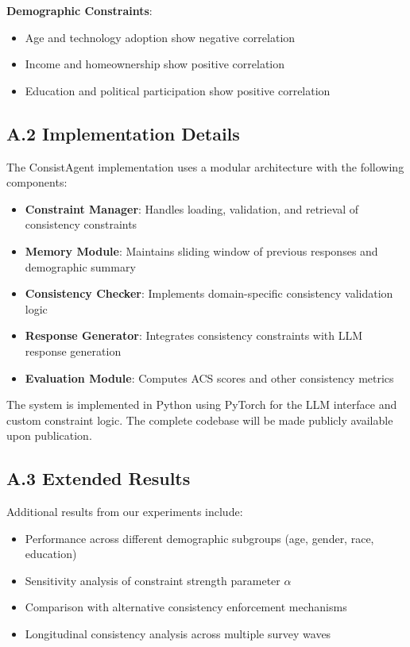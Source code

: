 \documentclass[sigconf, anonymous]{acmart}
\begin{document}
\textbf{Demographic Constraints}:
\begin{itemize}
    \item Age and technology adoption show negative correlation
    \item Income and homeownership show positive correlation
    \item Education and political participation show positive correlation
\end{itemize}

\subsection*{A.2 Implementation Details}

The ConsistAgent implementation uses a modular architecture with the following components:

\begin{itemize}
    \item \textbf{Constraint Manager}: Handles loading, validation, and retrieval of consistency constraints
    \item \textbf{Memory Module}: Maintains sliding window of previous responses and demographic summary
    \item \textbf{Consistency Checker}: Implements domain-specific consistency validation logic
    \item \textbf{Response Generator}: Integrates consistency constraints with LLM response generation
    \item \textbf{Evaluation Module}: Computes ACS scores and other consistency metrics
\end{itemize}

The system is implemented in Python using PyTorch for the LLM interface and custom constraint logic. The complete codebase will be made publicly available upon publication.

\subsection*{A.3 Extended Results}

Additional results from our experiments include:

\begin{itemize}
    \item Performance across different demographic subgroups (age, gender, race, education)
    \item Sensitivity analysis of constraint strength parameter $\alpha$
    \item Comparison with alternative consistency enforcement mechanisms
    \item Longitudinal consistency analysis across multiple survey waves
\end{itemize}
\end{document}
